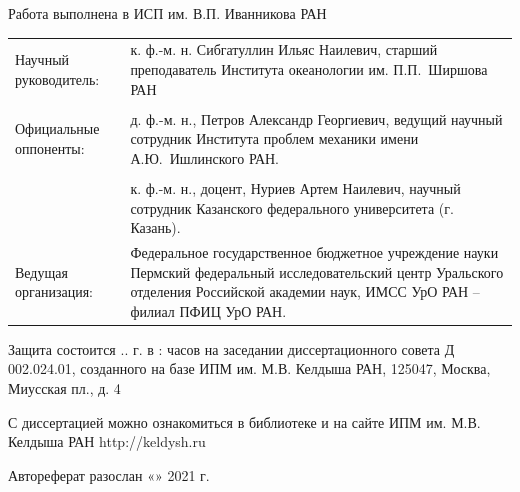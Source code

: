 \documentclass[utf8x]{G7-32} %
\begin{document}
\newpage
\pagestyle{empty}
\begin{spacing}{1.2}
\pagestyle{empty}
\begin{flushleft}
  Работа выполнена в ИСП им. В.П. Иванникова РАН
\end{flushleft}
\pagestyle{empty}
\begin{flushleft}
\begin{tabular}{p{5.8cm} p{10.5cm}}
    Научный руководитель: & к. ф.-м. н. Сибгатуллин Ильяс Наилевич, старший преподаватель Института океанологии им. П.П.~Ширшова РАН  \\

    \\

    Официальные оппоненты: &  д. ф.-м. н., Петров Александр Георгиевич, ведущий научный сотрудник Института проблем механики имени А.Ю.~Ишлинского РАН. \\

    \\

    & к. ф.-м. н., доцент, Нуриев Артем Наилевич, научный сотрудник Казанского федерального университета (г. Казань).
    
    \\

    Ведущая организация: &  Федеральное государственное бюджетное учреждение науки Пермский  федеральный  исследовательский  центр  Уральского  отделения Российской академии наук, ИМСС УрО РАН – филиал ПФИЦ УрО РАН.
    
\end{tabular}
\end{flushleft}

\begin{flushleft}
    Защита состоится \underline{\hspace{0.3cm}}.\underline{\hspace{0.3cm}}.\underline{\hspace{0.3cm}} г. в \underline{\hspace{0.3cm}}:\underline{\hspace{0.3cm}} часов на заседании диссертационного совета Д 002.024.01, созданного на базе ИПМ им. М.В. Келдыша РАН, 125047, Москва, Миусская пл., д. 4

    \setlength{\parskip}{1em}

    С диссертацией можно ознакомиться в библиотеке и на сайте ИПМ им. М.В. Келдыша РАН http://keldysh.ru 

    \setlength{\parskip}{1em}
    \vspace{1cm}
    Автореферат разослан «\underline{\hspace{1cm}}» \underline{\hspace{4cm}} 2021 г.    
\end{flushleft}
\vspace{2cm}
\setlength{\parskip}{1em}
\begin{flushleft}
    \begin{tabular}{p{10cm} p{5cm}}


\end{tabular}
\end{flushleft}
\end{spacing}
\end{document}
